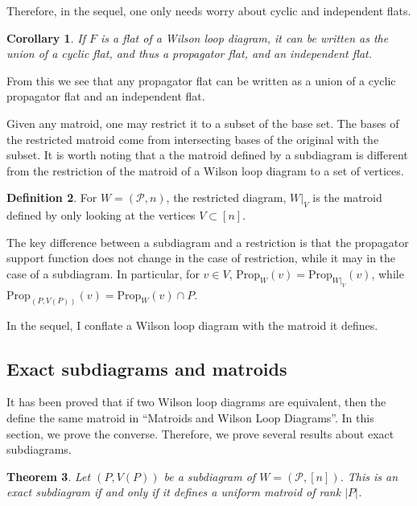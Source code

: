 \documentclass[11pt]{article}
\newcommand{\cP}{\mathcal{P}}
\newcommand{\Prop}{\textrm{Prop}}
\newtheorem{thm}{Theorem}[section]
\newtheorem{cor}[thm]{Corollary}
\theoremstyle{remark}
\theoremstyle{definition}
\newtheorem{dfn}[thm]{Definition}
\begin{document}
Therefore, in the sequel, one only needs worry about cyclic and independent flats.

\begin{cor} \label{classifyflats}
If $F$ is a flat of a Wilson loop diagram, it can be written as the union of a cyclic flat, and thus a propagator flat, and an independent flat.
\end{cor}
From this we see that any propagator flat can be written as a union of a cyclic propagator flat and an independent flat.

Given any matroid, one may restrict it to a subset of the base set. The bases of the restricted matroid come from intersecting bases of the original with the subset. It is worth noting that a the matroid defined by a subdiagram is different from the restriction of the matroid of a Wilson loop diagram to a set of vertices.

\begin{dfn} \label{restrictiondfn}
For $W = (\cP, n)$, the restricted diagram, $W|_V$ is the matroid defined by only looking at the vertices $V \subset [n]$.
\end{dfn}

The key difference between a subdiagram and a restriction is that the propagator support function does not change in the case of restriction, while it may in the case of a subdiagram. In particular, for $v \in V$, $\Prop_W(v) = \Prop_{W|_V}(v)$, while $\Prop_{(P, V(P))} (v) = \Prop_W(v) \cap P$.

In the sequel, I conflate a Wilson loop diagram with the matroid it defines.



\subsection{Exact subdiagrams and matroids}

It has been proved that if two Wilson loop diagrams are equivalent, then the define the same matroid in ``Matroids and Wilson Loop Diagrams''. In this section, we prove the converse. Therefore, we prove several results about exact subdiagrams.


\begin{thm} \label{exactcircuitlem}
Let $(P, V(P))$ be a subdiagram of $W= (\cP, [n])$. This is an exact subdiagram if and only if it defines a uniform matroid of rank $|P|$.
\end{thm}
\end{document}
